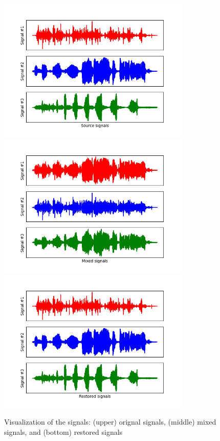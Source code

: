 \documentclass[conference]{IEEEtran}
\begin{document}
\begin{figure}[!t]
	\centering
	\includegraphics[width=3.6in]{original.png}	
	\includegraphics[width=3.6in]{mixed.png}	
	\includegraphics[width=3.6in]{restored.png}	
	\caption{Visualization of the signals: (upper) orignal signals, (middle) mixed signals, and (bottom) restored signals}
	\label{fig:signal}
\end{figure}
\end{document}
